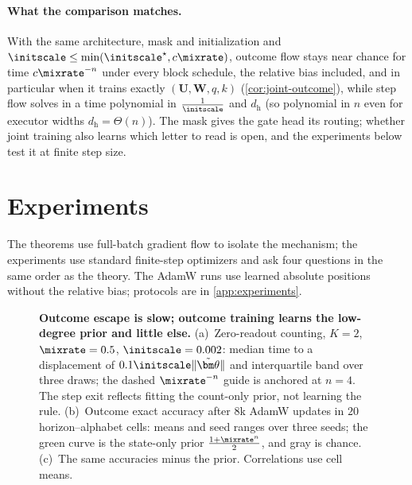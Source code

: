 \paragraph{What the comparison matches.} With the same architecture, mask and initialization and $\initscale\le\min(\initscale^\star,c\mixrate)$,
outcome flow stays near chance for time $c\mixrate^{-n}$ under every block schedule, the relative bias included, and in particular when it
trains exactly $(\mathbf U,\mathbf W,q,k)$ (\cref{cor:joint-outcome}), while step flow solves in a time polynomial in $\frac{1}{\initscale}$ and $d_{\mathrm h}$ (so polynomial in $n$ even for executor widths $d_{\mathrm h}=\Theta(n)$). The mask gives
the gate head its routing; whether joint training also learns which letter to read is open, and the experiments below test it at
finite step size.

\suppressfloats[t]
\section{Experiments}
\label{sec:experiments}
\label{sec:validation}

The theorems use full-batch gradient flow to isolate the mechanism; the experiments use standard finite-step optimizers
and ask four questions in the same order as the theory. The AdamW runs use learned absolute positions without the relative bias;
protocols are in \cref{app:experiments}.

\begin{figure}[t]
\centering
\resizebox{\linewidth}{!}{}
\caption{\textbf{Outcome escape is slow; outcome training learns the low-degree prior and little else.}
(a)~Zero-readout counting, $K=2$, $\mixrate=0.5$, $\initscale=0.002$: median time to a displacement of $0.1\initscale\|\tilde{\bm\theta}\|$ and interquartile band over three draws; the dashed $\mixrate^{-n}$ guide is anchored at $n=4$. The step exit reflects fitting the count-only prior, not learning the rule.
(b)~Outcome exact accuracy after $8$k AdamW updates in $20$ horizon--alphabet cells: means and seed ranges over three seeds; the green curve is the state-only prior $\frac{1+\mixrate^n}{2}$, and gray is chance.
(c)~The same accuracies minus the prior. Correlations use cell means.}
\label{fig:theory-measurement}
\label{fig:lambda-grid}
\end{figure}

